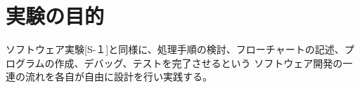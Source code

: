 

\section{実験の目的}
  ソフトウェア実験[S-１]と同様に、処理手順の検討、フローチャートの記述、プログラムの作成、デバッグ、テストを完了させるという
  ソフトウェア開発の一連の流れを各自が自由に設計を行い実践する。


